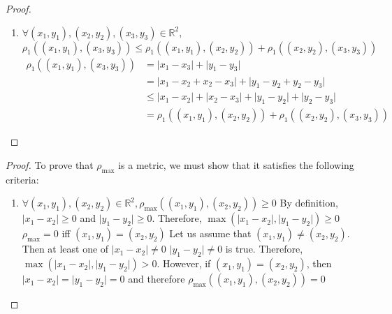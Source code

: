\documentclass{article}
\begin{document}
\begin{enumerate}
\begin{proof}
\begin{enumerate}
                        \item $\forall(x_1,y_1),(x_2,y_2),(x_3,y_3)\in\mathbb{R}^2,$ \\
                              $\rho_1((x_1,y_1),(x_3,y_3))\leq \rho_1((x_1,y_1),(x_2,y_2))+\rho_1((x_2,y_2),(x_3,y_3))$
                              \begin{align*}
                                    \rho_1((x_1, y_1),(x_3,y_3)) & = \lvert x_1-x_3\rvert+\lvert y_1-y_3\rvert                                              \\
                                                                 & = \lvert x_1-x_2+x_2-x_3\rvert+\lvert y_1-y_2+y_2-y_3\rvert                              \\
                                                                 & \leq \lvert x_1-x_2\rvert+\lvert x_2-x_3\rvert+\lvert y_1-y_2\rvert+\lvert y_2-y_3\rvert \\
                                                                 & = \rho_1((x_1,y_1),(x_2,y_2))+\rho_1((x_2,y_2),(x_3,y_3))
                              \end{align*}
                  \end{enumerate}
            \end{proof}
            \begin{proof}
                  To prove that $\rho_{\max}$ is a metric, we must show that it satisfies
                  the following criteria:
                  \begin{enumerate}
                        \item $\forall (x_1,y_1),(x_2,y_2)\in\mathbb{R}^2, \rho_{\max}((x_1,y_1),(x_2,y_2))\geq 0$
                              \medbreak
                              By definition, $\lvert x_1-x_2\rvert\geq 0$ and $\lvert y_1-y_2\rvert\geq 0$.
                              Therefore, $\max(\lvert x_1-x_2\rvert,\lvert y_1-y_2\rvert)\geq 0$
                              \medbreak
                              $\rho_{\max}=0$ iff $(x_1,y_1)=(x_2,y_2)$
                              \medbreak
                              Let us assume that $(x_1,y_1)\neq (x_2,y_2)$. Then at least one of $\lvert x_1-x_2\rvert\neq 0$
                              $\lvert y_1-y_2\rvert\neq 0$ is true. Therefore, $\max(\lvert x_1-x_2\rvert,\lvert y_1-y_2\rvert)> 0$.
                              However, if $(x_1,y_1) = (x_2,y_2)$, then $\lvert x_1-x_2\rvert = \lvert y_1-y_2\rvert = 0$ and
                              therefore $\rho_{\max}((x_1,y_1),(x_2,y_2))=0$

\end{enumerate}
\end{proof}
\end{enumerate}
\end{document}
